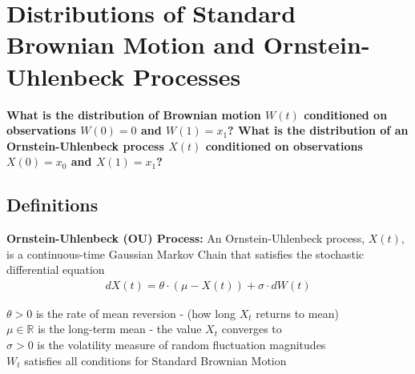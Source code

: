 \documentclass{article}
\newcommand{\R}{\mathbb{R}}
\begin{document}
\pagebreak

\section{Distributions of Standard Brownian Motion and Ornstein-Uhlenbeck Processes}

\begin{tcolorbox}[colback=white, colframe=black, boxrule=1pt]
\textbf{
What is the distribution of Brownian motion $W(t)$ conditioned on observations $W(0)=0$ and $W(1)=x_1$? What is the distribution of an Ornstein-Uhlenbeck process $X(t)$ conditioned on observations $X(0)=x_0$ and $X(1)=x_1$?
}
\end{tcolorbox}
\subsection{Definitions}
\textbf{Ornstein-Uhlenbeck (OU) Process: } An Ornstein-Uhlenbeck process, $X(t)$, is a continuous-time Gaussian Markov Chain that satisfies the stochastic differential equation
\begin{align*}
    dX(t)=\theta\cdot (\mu-X(t))+\sigma \cdot dW(t)
\end{align*}
\begin{center}
    $\theta>0$ is the rate of mean reversion - (how long $X_t$ returns to mean)\\
    $\mu\in \R$ is the long-term mean - the value $X_t$ converges to\\
    $\sigma>0$ is the volatility measure of random fluctuation magnitudes\\
    $W_t$ satisfies all conditions for Standard Brownian Motion
\end{center}
\end{document}
